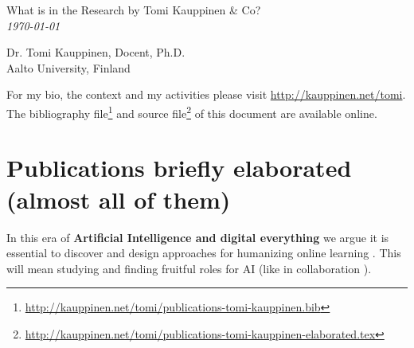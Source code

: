 \documentclass[11pt,letterpaper]{article}
\def\name{What is in the Research by Tomi Kauppinen \& Co?\\ \small{\textit{\today}}}
\begin{document}
{\huge \name}


\vspace{0.25in}

\begin{minipage}[t]{0.5\textwidth}
Dr. Tomi Kauppinen, Docent, Ph.D.\\
Aalto University, Finland \\

  \normalsize


\end{minipage}
\begin{minipage}[t]{0.5\textwidth}

\end{minipage}

\small For my bio, the context and my activities please visit
\url{http://kauppinen.net/tomi}.
The bibliography file\footnote{\url{http://kauppinen.net/tomi/publications-tomi-kauppinen.bib}}
and source
file\footnote{\url{http://kauppinen.net/tomi/publications-tomi-kauppinen-elaborated.tex}}
of this document are available online. 

\normalsize

\section*{Publications briefly elaborated (almost all of them)}


In this era of \textbf{Artificial Intelligence and digital everything} we argue it is essential to discover and design approaches for humanizing online learning \cite{humanizing-2024}. This will mean studying and finding fruitful roles for AI (like in collaboration \cite{ai-in-collaboration-2025}). 
\end{document}
